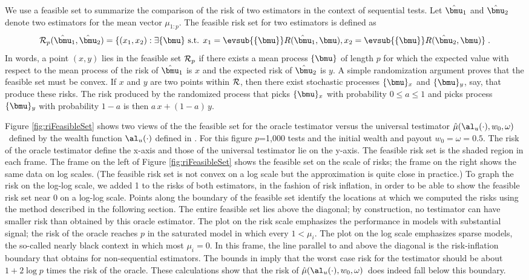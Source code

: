 \documentclass[12pt]{article}
\newcommand{\uTest}{\mbox{$\hat\mu(\al_u(\cdot),w_0,\omega)$}}
\begin{document}
 We use a feasible set to summarize the comparison of the risk of two estimators
 in the context of sequential tests.  Let $\hat{\bmu}_1$ and $\hat{\bmu}_2$
 denote two estimators for the mean vector $\mu_{1:p}$.  The feasible risk set
 for two estimators is defined as
 \begin{equation}
     {\cal R}_p(\hat{\bmu}_1,\hat{\bmu}_2) = 
      \{(x_1,x_2): \exists \{\bmu\} \mbox{ s.t. }
          x_1 = \evsub{\{\bmu\}} R(\hat{\bmu}_1,\bmu),
          x_2 = \evsub{\{\bmu\}} R(\hat{\bmu}_2,\bmu)  \} \;.           
 \label{eq:feasibleSet}
 \end{equation}
 In words, a point $(x,y)$ lies in the feasible set ${\cal R}_p$ if there exists
 a mean process $\{\bmu\}$ of length $p$ for which the expected value with
 respect to the mean process of the risk of $\hat{\bmu}_1$ is $x$ and the
 expected risk of $\hat{\bmu}_2$ is $y$.  A simple randomization argument proves
 that the feasible set must be convex.  If $x$ and $y$ are two points within
 ${\cal R}$, then there exist stochastic processes $\{\bmu\}_x$ and
 $\{\bmu\}_y$, say, that produce these risks.  The risk produced by the
 randomized process that picks $\{\bmu\}_x$ with probability $0 \le a \le 1$ and
 picks process $\{\bmu\}_y$ with probability $1-a$ is then $a\,x+(1-a)\,y$.


 Figure \ref{fig:riFeasibleSet} shows two views of the the feasible set for the
 oracle testimator versus the universal testimator \uTest\ defined by the wealth
 function $\al_u(\cdot)$ defined in .  For this figure $p$=1,000
 tests and the initial wealth and payout $w_0 = \omega = 0.5$.  The risk of the
 oracle testimator define the x-axis and those of the universal testimator lie
 on the y-axis.  The feasible risk set is the shaded region in each frame.  The
 frame on the left of Figure \ref{fig:riFeasibleSet} shows the feasible set on
 the scale of risks; the frame on the right shows the same data on log scales.
  (The feasible risk set is not convex on a log scale but the approximation is
 quite close in practice.) To graph the risk on the log-log scale, we added 1 to
 the risks of both estimators, in the fashion of risk inflation, in order to be
 able to show the feasible risk set near 0 on a log-log scale.  Points along the
 boundary of the feasible set identify the locations at which we computed the
 risks using the method described in the following section.  The entire feasible
 set lies above the diagonal; by construction, no testimator can have smaller
 risk than obtained by this oracle estimator.  The plot on the risk scale
 emphasizes the performance in models with substantial signal; the risk of the
 oracle reaches $p$ in the saturated model in which every $1 < \mu_i$.  The plot
 on the log scale emphasizes sparse models, the so-called nearly black context
 in which most $\mu_i = 0$.  In this frame, the line parallel to and above the
 diagonal is the risk-inflation boundary that obtains for non-sequential
 estimators.  The bounds in  imply that the worst case risk for the
 testimator should be about $1 + 2 \log p$ times the risk of the oracle.  These
 calculations show that the risk of \uTest\ does indeed fall below this
 boundary.  
\end{document}
